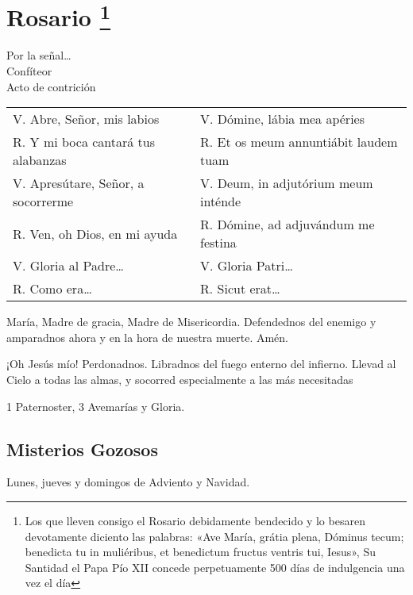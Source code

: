 \documentclass[11pt,a4paper]{book}
\begin{document}
    \chapter*{Rosario \footnote{Los que lleven consigo el Rosario debidamente bendecido y lo besaren devotamente diciento las palabras:
        «Ave María, grátia plena, Dóminus tecum; benedicta tu in muliéribus, et benedictum fructus ventris tui, Iesus», Su Santidad el 
        Papa Pío XII concede perpetuamente 500 días de indulgencia una vez el día}}

    \begin{center}
        Por la señal{\ldots}\\
        Confíteor\\
        Acto de contrición
    \end{center}

    \begin{longtable} {p{} p{} }
        V. Abre, Señor, mis labios & V. Dómine, lábia mea apéries\\
        R. Y mi boca cantará tus alabanzas & R. Et os meum annuntiábit laudem tuam\\
        V. Apresútare, Señor, a socorrerme & V. Deum, in adjutórium meum inténde\\
        R. Ven, oh Dios, en mi ayuda & R. Dómine, ad adjuvándum me festina\\ 
        V. Gloria al Padre{\ldots} & V. Gloria Patri{\ldots}\\
        R. Como era{\ldots} & R. Sicut erat{\ldots}\\
    \end{longtable}

    \begin{center}
        \label{sec:endTenPrayers}
        María, Madre de gracia, Madre de Misericordia. Defendednos del enemigo y amparadnos ahora y en la hora de nuestra muerte. Amén.
        
        ¡Oh Jesús mío! Perdonadnos. Libradnos del fuego enterno del infierno. Llevad al Cielo a todas las almas, y socorred especialmente 
        a las más necesitadas
    \end{center}


    \begin{center}
        1 Paternoster, 3 Avemarías y Gloria.
    \end{center}

    
    \section*{Misterios Gozosos}
    Lunes, jueves y domingos de Adviento y Navidad.
\end{document}
